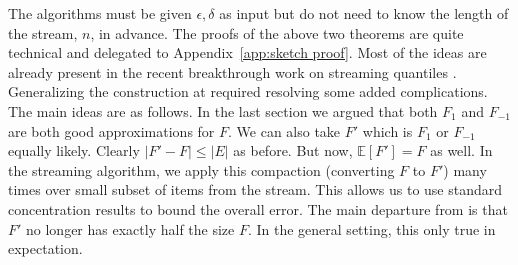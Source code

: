 \documentclass[anon,12pt]{colt2019} %
\newcommand{\E}{\mathbb{E}}
\newcommand{\eps}{\epsilon}
\begin{document}
The algorithms must be given $\eps, \delta$ as input but do not need to know the length of the stream, $n$, in advance. 
The proofs of the above two theorems are quite technical and delegated to Appendix~\ref{app:sketch proof}. Most of the ideas are already present in the recent breakthrough work on streaming quantiles \cite{DBLP:conf/focs/KarninLL16}. Generalizing the construction at  \cite{DBLP:conf/focs/KarninLL16} required resolving some added complications. The main ideas are as follows. 
In the last section we argued that both $F_1$ and $F_{-1}$ are both good approximations for $F$. We can also take $F'$ which is $F_1$ or $F_{-1}$ equally likely. Clearly $|F' - F| \le |E|$ as before. But now, $\E[F'] = F$ as well. In the streaming algorithm, we apply this compaction (converting $F$ to $F'$) many times over small subset of items from the stream. This allows us to use standard concentration results to bound the overall error. The main departure from \cite{DBLP:conf/focs/KarninLL16} is that $F'$ no longer has exactly half the size $F$. In the general setting, this only true in expectation.
\end{document}
